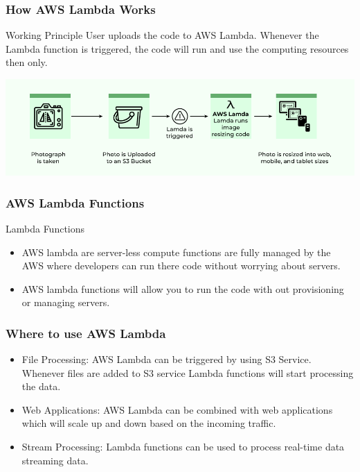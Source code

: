 \documentclass{beamer}
\begin{document}
\begin{frame}
\frametitle{How AWS Lambda Works}
\begin{block}{Working Principle}
User uploads the code to AWS Lambda. Whenever the Lambda function is triggered, the code will run and use the computing resources then only.
\end{block}

\begin{center}
\includegraphics[scale=0.35]{aws-LAMBDA.png}
\end{center}

\end{frame}

\begin{frame}
	\frametitle{AWS Lambda Functions}
	\begin{block}{Lambda Functions}
		\begin{itemize}		
			\item AWS lambda are server-less compute functions are fully managed by the AWS where developers can run there code without worrying about servers.
			\item AWS lambda functions will allow you to run the code with out provisioning or managing servers.
		\end{itemize}
	\end{block}
	
\end{frame}

\begin{frame}
	\frametitle{Where to use AWS Lambda}
	\begin{block}{}
	\begin{itemize}
		\vspace{1ex}
		\item File Processing: AWS Lambda can be triggered by using S3 Service. Whenever files are added to S3 service Lambda functions will start processing the data. \vspace{1ex} 
		\item Web Applications: AWS Lambda can be combined with web applications which will scale up and down based on the incoming traffic. \vspace{1ex}
		\item Stream Processing: Lambda functions can be used to process real-time data streaming data. \vspace{1ex}
	\end{itemize}
	\end{block}
\end{frame}
\end{document}
